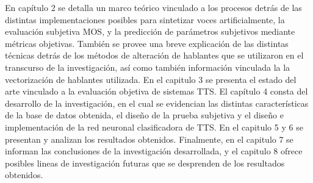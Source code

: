 En capítulo 2 se detalla un marco teórico vinculado a los procesos detrás de las distintas implementaciones posibles para sintetizar voces artificialmente, la evaluación subjetiva MOS, y la predicción de parámetros subjetivos mediante métricas objetivas. También se provee una breve explicación de las distintas técnicas detrás de los métodos de alteración de hablantes que se utilizaron en el transcurso de la investigación, así como también información vinculada la la vectorización de hablantes utilizada. En el capitulo 3 se presenta el estado del arte vinculado a la evaluación objetiva de sistemas TTS. El capítulo 4 consta del desarrollo de la investigación, en el cual se evidencian las distintas características de la base de datos obtenida, el diseño de la prueba subjetiva y el diseño e implementación de la red neuronal clasificadora de TTS. En el capitulo 5 y 6 se presentan y analizan los resultados obtenidos. Finalmente, en el capitulo 7 se informan las conclusiones de la investigación desarrollada, y el capitulo 8 ofrece posibles lineas de investigación futuras que se desprenden de los resultados obtenidos.

\newpage